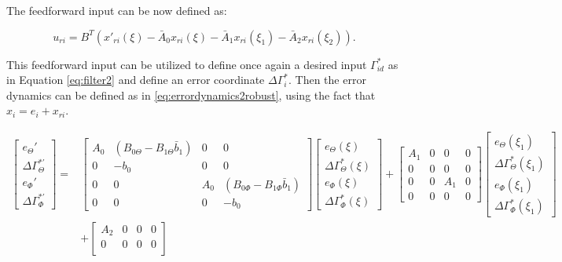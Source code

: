 \documentclass[main.tex]{subfiles}
\begin{document}
 The feedforward input can be now defined as:

	\begin{equation}
	u_{ri} = B^T (x'_{ri}(\xi) - \bar{A}_0 x_{ri}(\xi) - \bar{A}_1 x_{ri}(\xi_1) - \bar{A}_2 x_{ri}(\xi_2)).
	\label{eq:feedforwardrobust}
	\end{equation}

This feedforward input can be utilized to define once again a desired input $\Gamma_{id}^*$ as in Equation \eqref{eq:filter2} and define an error coordinate $\Delta \Gamma_i^*$. Then the error dynamics can be defined as in \eqref{eq:errordynamics2robust}, using the fact that $x_i = e_i + x_{ri}$.


\begin{align}
\begin{bmatrix}
e_\Theta' \\
\Delta \Gamma_\Theta^{*'} \\
e_\Phi' \\
\Delta \Gamma_\Phi^{*'}
\end{bmatrix} =&
\begin{bmatrix}
A_0 & (B_{0\Theta} - B_{1\Theta} \bar{b}_1) & 0 & 0\\
0 & -b_0 & 0 & 0 \\
0 & 0 & A_0 & (B_{0\Phi} - B_{1\Phi} \bar{b}_1) \\
0 & 0 & 0 & -b_0
\end{bmatrix}
\begin{bmatrix}
e_\Theta(\xi) \\
\Delta \Gamma_\Theta^{*} (\xi) \\
e_\Phi(\xi) \\
\Delta \Gamma_\Phi^{*} (\xi) 
\end{bmatrix} + 
\begin{bmatrix}
A_1 & 0 & 0 & 0\\
0 & 0 & 0 & 0 \\
0 & 0 & A_1 & 0 \\
0 & 0 & 0 & 0 
\end{bmatrix}
\begin{bmatrix}
e_\Theta(\xi_1) \\
\Delta \Gamma_\Theta^{*} (\xi_1) \\
e_\Phi(\xi_1) \\
\Delta \Gamma_\Phi^{*} (\xi_1) 
\end{bmatrix} \nonumber\\
&+
\begin{bmatrix}
A_2 & 0 & 0 & 0\\
0 & 0 & 0 & 0 \\

\end{bmatrix}
\end{align}
\end{document}
